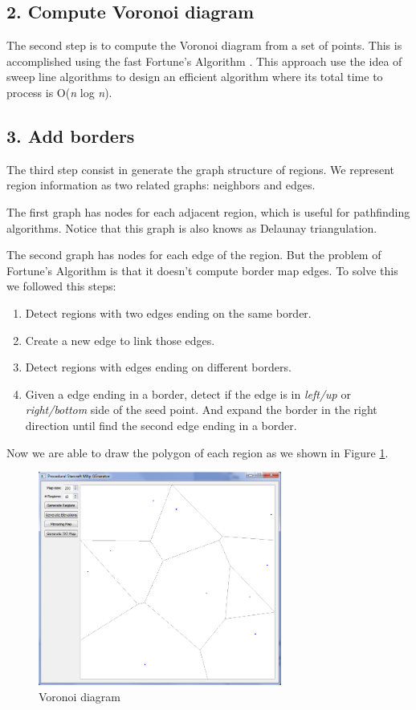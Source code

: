 \documentclass[letterpaper]{article}
\begin{document}
\subsection{2. Compute Voronoi diagram}
The second step is to compute the Voronoi diagram from a set of points. This is accomplished using the fast Fortune's Algorithm \cite{Fortune}. This approach use the idea of sweep line algorithms to design an efficient algorithm where its total time to process is O(\emph{n} log \emph{n}).

\subsection{3. Add borders}
The third step consist in generate the graph structure of regions. We represent region information as two related graphs: neighbors and edges.

The first graph has nodes for each adjacent region, which is useful for pathfinding algorithms. Notice that this graph is also knows as Delaunay triangulation.

The second graph has nodes for each edge of the region. But the problem of Fortune's Algorithm is that it doesn't compute border map edges. To solve this we followed this steps:
\begin{enumerate}
	\item Detect regions with two edges ending on the same border.
	\item Create a new edge to link those edges.
	\item Detect regions with edges ending on different borders.
	\item Given a edge ending in a border, detect if the edge is in \emph{left/up} or \emph{right/bottom} side of the seed point. And expand the border in the right direction until find the second edge ending in a border.
\end{enumerate}
Now we are able to draw the polygon of each region as we shown in Figure \ref{fig:voronoi-diagram}.

\begin{figure}[h]
    \centering
    \includegraphics[width=8cm]{PCG02.png}
    \caption{Voronoi diagram}
    \label{fig:voronoi-diagram}
\end{figure}
\end{document}
